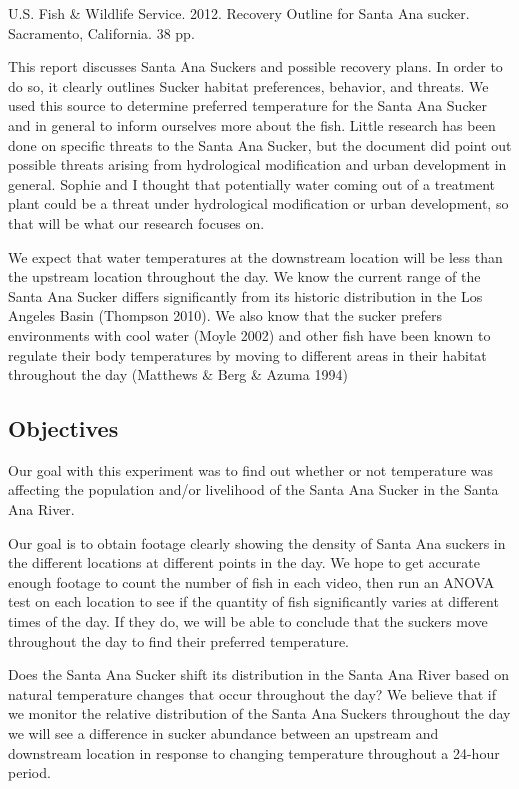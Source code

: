 \documentclass{article}\usepackage[]{graphicx}\usepackage[]{color}
\begin{document}
U.S. Fish \& Wildlife Service. 2012. Recovery Outline for Santa Ana sucker. Sacramento, California. 38 pp.

This report discusses Santa Ana Suckers and possible recovery plans. In order to do so, it clearly outlines Sucker habitat preferences, behavior, and threats. We used this source to determine preferred temperature for the Santa Ana Sucker and in general to inform ourselves more about the fish. Little research has been done on specific threats to the Santa Ana Sucker, but the document did point out possible threats arising from hydrological modification and urban development in general. Sophie and I thought that potentially water coming out of a treatment plant could be a threat under hydrological modification or urban development, so that will be what our research focuses on.

We expect that water temperatures at the downstream location will be less than the upstream location throughout the day. We know the current range of the Santa Ana Sucker differs significantly from its historic distribution in the Los Angeles Basin (Thompson 2010). We also know that the sucker prefers environments with cool water (Moyle 2002) and other fish have been known to regulate their body temperatures by moving to different areas in their habitat throughout the day (Matthews & Berg & Azuma 1994)

\subsection{Objectives}
Our goal with this experiment was to find out whether or not temperature was affecting the population and/or livelihood of the Santa Ana Sucker in the Santa Ana River.

Our goal is to obtain footage clearly showing the density of Santa Ana suckers in the different locations at different points in the day.  We hope to get accurate enough footage to count the number of fish in each video, then run an ANOVA test on each location to see if the quantity of fish significantly varies at different times of the day.  If they do, we will be able to conclude that the suckers move throughout the day to find their preferred temperature.

Does the Santa Ana Sucker shift its distribution in the Santa Ana River based on natural temperature changes that occur throughout the day? We believe that if we monitor the relative distribution of the Santa Ana Suckers throughout the day we will see a difference in sucker abundance between an upstream and downstream location in response to changing temperature throughout a 24-hour period.
\end{document}
